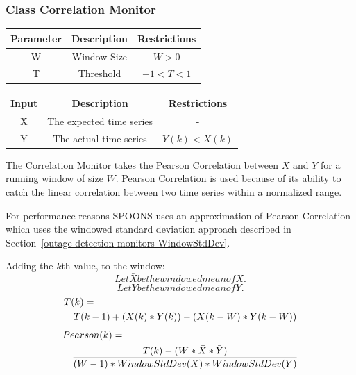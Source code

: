\documentclass[12pt]{ucthesis}
\begin{document}
\subsubsection{Class Correlation Monitor}
\label{outage-detection-monitors-Correlation}
\begin{table}[H]
   \begin{center}
      \begin{tabular}{|c|c|c|}
         \hline
            Parameter & Description & Restrictions \\
         \hline
            W & Window Size & $ W > 0 $\\
         \hline
            T & Threshold & $ -1 < T < 1 $\\
         \hline
      \end{tabular}
   \end{center}
\end{table}

\begin{table}[H]
   \begin{center}
      \begin{tabular}{|c|c|c|}
         \hline
            Input & Description & Restrictions \\
         \hline
            X & The expected time series & - \\
         \hline
            Y & The actual time series & $ Y(k) < X(k) $\\
         \hline
      \end{tabular}
   \end{center}
\end{table}

The Correlation Monitor takes the Pearson Correlation between $X$ and $Y$ for a running window of size $W$.
Pearson Correlation is used because of its ability to catch the linear correlation between two time series within
a normalized range.

For performance reasons SPOONS uses an approximation of Pearson Correlation which uses the windowed standard deviation approach
described in Section~\ref{outage-detection-monitors-WindowStdDev}.

Adding the $k$th value, to the window:
$$
   Let \bar{X} be the windowed mean of X.
$$
$$
   Let \bar{Y} be the windowed mean of Y.
$$
\begin{eqnarray*}
   \lefteqn{T(k) = }\\
   && T(k - 1) + (X(k) * Y(k)) - (X(k - W) * Y(k -W))
\end{eqnarray*}
\begin{eqnarray*}
   \lefteqn{Pearson(k) = }\\
   && \frac{T(k) - (W * \bar{X} * \bar{Y})}{(W - 1) * WindowStdDev(X) * WindowStdDev(Y)}
\end{eqnarray*}
\end{document}
